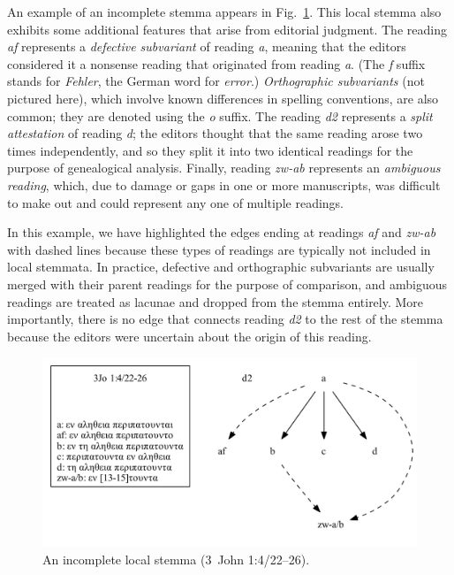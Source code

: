 \documentclass[a4paper, 12pt]{article}
\begin{document}
	An example of an incomplete stemma appears in Fig.~\ref{fig:local-stemma-incomplete}. This local stemma also exhibits some additional features that arise from editorial judgment. The reading \emph{af} represents a \emph{defective subvariant} of reading \emph{a}, meaning that the editors considered it a nonsense reading that originated from reading \emph{a}. (The \emph{f} suffix stands for \emph{Fehler}, the German word for \emph{error}.) \emph{Orthographic subvariants} (not pictured here), which involve known differences in spelling conventions, are also common; they are denoted using the \emph{o} suffix. The reading \emph{d2} represents a \emph{split attestation} of reading \emph{d}; the editors thought that the same reading arose two times independently, and so they split it into two identical readings for the purpose of genealogical analysis. Finally, reading \emph{zw-a\ForwardSlash b} represents an \emph{ambiguous reading}, which, due to damage or gaps in one or more manuscripts, was difficult to make out and could represent any one of multiple readings.
	
	In this example, we have highlighted the edges ending at readings \emph{af} and \emph{zw-a\ForwardSlash b} with dashed lines because these types of readings are typically not included in local stemmata. In practice, defective and orthographic subvariants are usually merged with their parent readings for the purpose of comparison, and ambiguous readings are treated as lacunae and dropped from the stemma entirely. More importantly, there is no edge that connects reading \emph{d2} to the rest of the stemma because the editors were uncertain about the origin of this reading.
	
	\begin{figure}[h!]
		\centering
		\includegraphics[scale=0.6666]{../graphics/B25K1V4U22-26-local-stemma.pdf}
		\caption{An incomplete local stemma (3~John 1:4/22–26).}
		\label{fig:local-stemma-incomplete}
	\end{figure}
	
\end{document}
